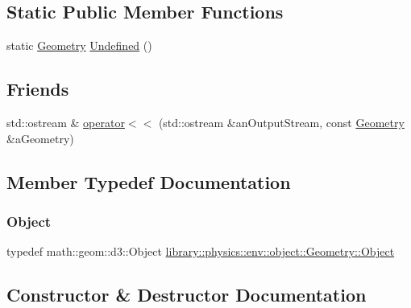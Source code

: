 \subsection*{Static Public Member Functions}
\begin{DoxyCompactItemize}
\item 
static \hyperlink{classlibrary_1_1physics_1_1env_1_1object_1_1_geometry}{Geometry} \hyperlink{classlibrary_1_1physics_1_1env_1_1object_1_1_geometry_a5e02f2d9a9a6ac2686f49780811d0fe2}{Undefined} ()
\end{DoxyCompactItemize}
\subsection*{Friends}
\begin{DoxyCompactItemize}
\item 
std\+::ostream \& \hyperlink{classlibrary_1_1physics_1_1env_1_1object_1_1_geometry_aebfe5b9b5d8cd3dd8a2cfd140a1df583}{operator$<$$<$} (std\+::ostream \&an\+Output\+Stream, const \hyperlink{classlibrary_1_1physics_1_1env_1_1object_1_1_geometry}{Geometry} \&a\+Geometry)
\end{DoxyCompactItemize}


\subsection{Member Typedef Documentation}
\mbox{\label{classlibrary_1_1physics_1_1env_1_1object_1_1_geometry_a4889a934df09768235fa2d89d0b0b0d6}} 
\subsubsection{\texorpdfstring{Object}{Object}}
{\footnotesize\ttfamily typedef math\+::geom\+::d3\+::\+Object \hyperlink{classlibrary_1_1physics_1_1env_1_1object_1_1_geometry_a4889a934df09768235fa2d89d0b0b0d6}{library\+::physics\+::env\+::object\+::\+Geometry\+::\+Object}}



\subsection{Constructor \& Destructor Documentation}
\mbox{\label{classlibrary_1_1physics_1_1env_1_1object_1_1_geometry_a150ec4f85fe2c76471833df4145b96e8}} 
